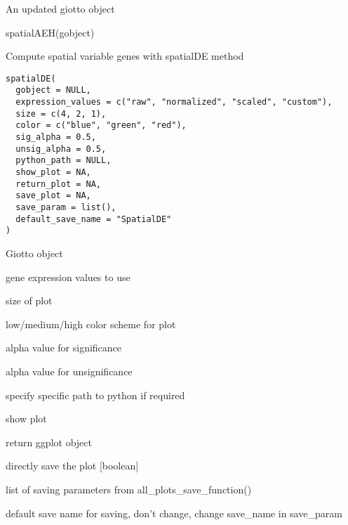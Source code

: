 \documentclass[a4paper]{book}
\begin{document}
%
\begin{Value}
An updated giotto object
\end{Value}
%
\begin{Examples}
\begin{ExampleCode}
    spatialAEH(gobject)
\end{ExampleCode}
\end{Examples}
%
\begin{Description}\relax
Compute spatial variable genes with spatialDE method
\end{Description}
%
\begin{Usage}
\begin{verbatim}
spatialDE(
  gobject = NULL,
  expression_values = c("raw", "normalized", "scaled", "custom"),
  size = c(4, 2, 1),
  color = c("blue", "green", "red"),
  sig_alpha = 0.5,
  unsig_alpha = 0.5,
  python_path = NULL,
  show_plot = NA,
  return_plot = NA,
  save_plot = NA,
  save_param = list(),
  default_save_name = "SpatialDE"
)
\end{verbatim}
\end{Usage}
%
\begin{Arguments}
\begin{ldescription}
\item[\code{gobject}] Giotto object

\item[\code{expression\_values}] gene expression values to use

\item[\code{size}] size of plot

\item[\code{color}] low/medium/high color scheme for plot

\item[\code{sig\_alpha}] alpha value for significance

\item[\code{unsig\_alpha}] alpha value for unsignificance

\item[\code{python\_path}] specify specific path to python if required

\item[\code{show\_plot}] show plot

\item[\code{return\_plot}] return ggplot object

\item[\code{save\_plot}] directly save the plot [boolean]

\item[\code{save\_param}] list of saving parameters from all\_plots\_save\_function()

\item[\code{default\_save\_name}] default save name for saving, don't change, change save\_name in save\_param
\end{ldescription}
\end{Arguments}
\end{document}
